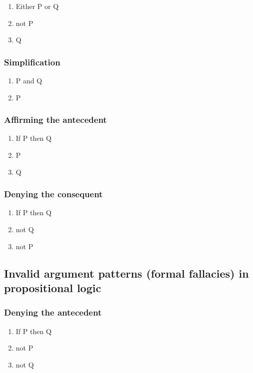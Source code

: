 \begin{enumerate}
    \item Either P or Q
    \item not P
    \item Q
\end{enumerate}

\subsubsection{Simplification}

\begin{enumerate}
    \item P and Q
    \item P
\end{enumerate}

\subsubsection{Affirming the antecedent}

\begin{enumerate}
    \item If P then Q
    \item P
    \item Q
\end{enumerate}

\subsubsection{Denying the consequent}

\begin{enumerate}
    \item If P then Q
    \item not Q
    \item not P
\end{enumerate}

\subsection{Invalid argument patterns (formal fallacies)
in propositional logic}

\subsubsection{Denying the antecedent}

\begin{enumerate}
    \item If P then Q
    \item not P
    \item not Q
\end{enumerate}

